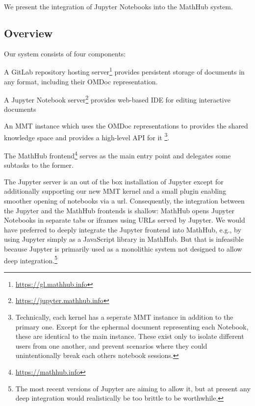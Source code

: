 We present the integration of Jupyter Notebooks into the MathHub system.

\subsection{Overview}

Our system consists of four components:
\begin{compactitem}
\item A GitLab repository hosting server\footnote{\url{https://gl.mathhub.info}} provides persistent storage of documents in any format, including their OMDoc representation.
\item A Jupyter Notebook server\footnote{\url{https://jupyter.mathhub.info}} provides web-based IDE for editing interactive documents
\item An MMT instance which uses the OMDoc representations to provides the shared knowledge space and provides a high-level API for it
  \footnote{
    Technically, each kernel has a seperate MMT instance in addition to the primary one. 
    Except for the ephermal document representing each Notebook, these are identical to the main instance. 
    These exist only to isolate different users from one another, and prevent scenarios where they could unintentionally break each others notebook sessions.  
  }.
  \item The MathHub frontend\footnote{\url{https://mathhub.info}} serves as the main entry point and delegates some subtasks to the former.
\end{compactitem}

The Jupyter server is an out of the box installation of Jupyter except for additionally supporting our new MMT kernel and a small plugin enabling smoother opening of notebooks via a url. 
Consequently, the integration between the Jupyter and the MathHub frontends is shallow: MathHub opens Jupyter Notebooks in separate tabs or iframes using URLs served by Jupyter.
We would have preferred to deeply integrate the Jupyter frontend into MathHub, e.g., by using Jupyter simply as a JavaScript library in MathHub.
But that is infeasible because Jupyter is primarily used as a monolithic system not designed to allow deep integration.\footnote{The most recent versions of Jupyter are aiming to allow it, but at present any deep integration would realistically be too brittle to be worthwhile.}

